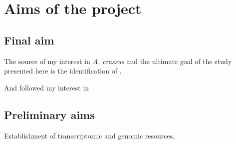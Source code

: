 
\chapter{Aims of the project} %



\section{Final aim}

The source of my interest in \textit{A. crassus} and the ultimate goal
of the study presented here is the identification of .

And followed my interest in


\section{Preliminary aims}

Establishment of transcriptomic and genomic resources, 



